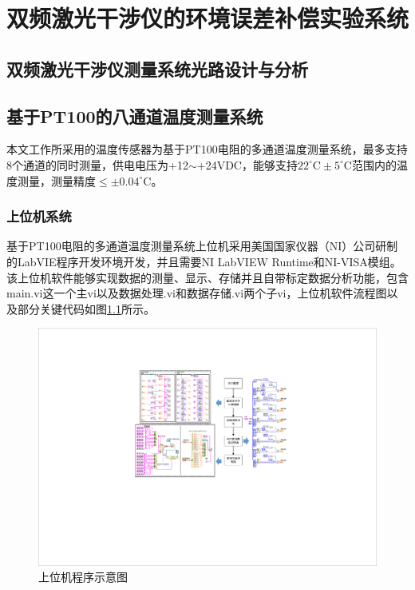 \chapter{双频激光干涉仪的环境误差补偿实验系统}
\section{双频激光干涉仪测量系统光路设计与分析}
\section{基于PT100的八通道温度测量系统}
本文工作所采用的温度传感器为基于PT100电阻的多通道温度测量系统，最多支持8个通道的同时测量，供电电压为+12$\sim$+24VDC，能够支持\(22^{\circ} \mathrm{C} \pm 5^{\circ} \mathrm{C}\)范围内的温度测量，测量精度\(\leq \pm 0.04^{\circ} \mathrm{C}\)。

\subsection{上位机系统}
基于PT100电阻的多通道温度测量系统上位机采用美国国家仪器（NI）公司研制的LabVIE程序开发环境开发，并且需要NI LabVIEW Runtime和NI-VISA模组。该上位机软件能够实现数据的测量、显示、存储并且自带标定数据分析功能，包含main.vi这一个主vi以及数据处理.vi和数据存储.vi两个子vi，上位机软件流程图以及部分关键代码如图\ref{fig:上位机程序示意图}所示。
\begin{figure}[htb]
    \centering
    \includegraphics[width=14cm]{fig/3-fig/上位机程序示意图.pdf}
    \caption{上位机程序示意图}
    \label{fig:上位机程序示意图}
\end{figure}

